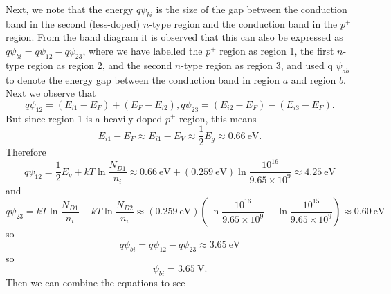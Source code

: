 \documentclass{article}
\begin{document}
Next, we note that the energy $q \psi_{bi}$ is the size of the gap between 
the conduction band in the second (less-doped) $n$-type region and the 
conduction band in the $p^{+}$ region. From the band diagram it is observed 
that this can also be expressed as $q\psi_{bi} = q\psi_{12} - q\psi_{23}$, 
where we have labelled the $p^{+}$ region as region 1, the first $n$-type 
region as region 2, and the second $n$-type region as region 3, and used 
q $\psi_{ab}$ to denote the energy gap between the conduction band in region
$a$ and region $b$. Next we observe that 
$$
q\psi_{12} = (E_{i1} - E_{F}) + (E_{F} - E_{i2}),
q\psi_{23} = (E_{i2} - E_{F}) - (E_{i3} - E_{F}).
$$
But since region 1 is a heavily doped $p^{+}$ region, this means
$$
E_{i1} - E_{F} \approx E_{i1} - E_{V} 
               \approx \frac{1}{2} E_{g}
               \approx 0.66 ~\mathrm{eV}.
$$
Therefore
$$
q\psi_{12} = \frac{1}{2} E_{g} + kT \ln \frac{N_{D1}}{n_i}
           \approx 0.66 ~\mathrm{eV}
          + (0.259 ~\mathrm{eV}) \ln \frac{10^{16}}{9.65 \times 10^{9}}
           \approx 4.25 ~\mathrm{eV}
$$
and
$$
q\psi_{23} = kT \ln \frac{N_{D1}}{n_i} 
           - kT \ln \frac{N_{D2}}{n_i}
           \approx
             (0.259 ~\mathrm{eV})\left(\ln\frac{10^{16}}{9.65 \times 10^{9}}
                                     - \ln\frac{10^{15}}{9.65 \times 10^{9}}\right) 
           \approx 0.60 ~\mathrm{eV}
$$
so
$$
q \psi_{bi} = q\psi_{12} - q\psi_{23} \approx 3.65 ~\mathrm{eV}
$$
so
$$
\psi_{bi} = 3.65 ~\mathrm{V}.
$$
Then we can combine the equations to see
\end{document}
